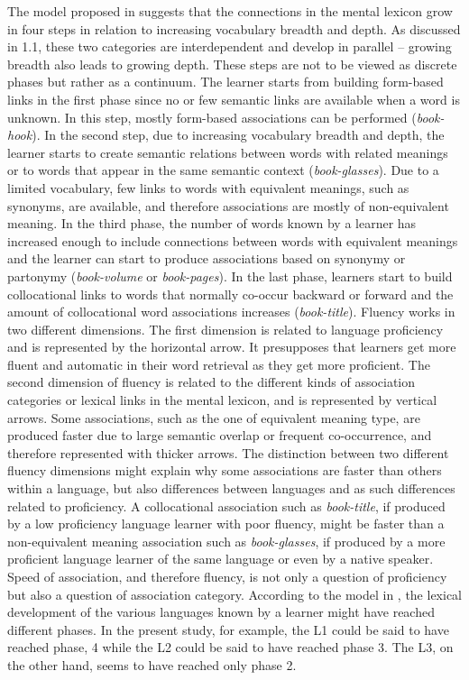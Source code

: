 \documentclass[output=paper,colorlinks,citecolor=brown,nonflat]{langsci/langscibook}
\begin{document}
The model proposed in  suggests that the connections in the mental lexicon grow in four steps in relation to increasing vocabulary breadth and depth. As discussed in 1.1, these two categories are interdependent and develop in parallel – growing breadth also leads to growing depth. These steps are not to be viewed as discrete phases but rather as a continuum. The learner starts from building form-based links in the first phase since no or few semantic links are available when a word is unknown. In this step, mostly form-based associations can be performed (\textit{book-hook}). In the second step, due to increasing vocabulary breadth and depth, the learner starts to create semantic relations between words with related meanings or to words that appear in the same semantic context (\textit{book-glasses}). Due to a limited vocabulary, few links to words with equivalent meanings, such as synonyms, are available, and therefore associations are mostly of non-equivalent meaning. In the third phase, the number of words known by a learner has increased enough to include connections between words with equivalent meanings and the learner can start to produce associations based on synonymy or partonymy (\textit{book-volume} or \textit{book-pages}). In the last phase, learners start to build collocational links to words that normally co-occur backward or forward and the amount of collocational word associations increases (\textit{book-title}). Fluency works in two different dimensions. The first dimension is related to language proficiency and is represented by the horizontal arrow. It presupposes that learners get more fluent and automatic in their word retrieval as they get more proficient. The second dimension of fluency is related to the different kinds of association categories or lexical links in the mental lexicon, and is represented by vertical arrows. Some associations, such as the one of equivalent meaning type, are produced faster due to large semantic overlap or frequent co-occurrence, and therefore represented with thicker arrows. The distinction between two different fluency dimensions might explain why some associations are faster than others within a language, but also differences between languages and as such differences related to proficiency. A collocational association such as \textit{book-title}, if produced by a low proficiency language learner with poor fluency, might be faster than a non-equivalent meaning association such as \textit{book-glasses}, if produced by a more proficient language learner of the same language or even by a native speaker. Speed of association, and therefore fluency, is not only a question of proficiency but also a question of association category. According to the model in , the lexical development of the various languages known by a learner might have reached different phases. In the present study, for example, the L1 could be said to have reached phase, 4 while the L2 could be said to have reached phase 3. The L3, on the other hand, seems to have reached only phase 2.
\end{document}
